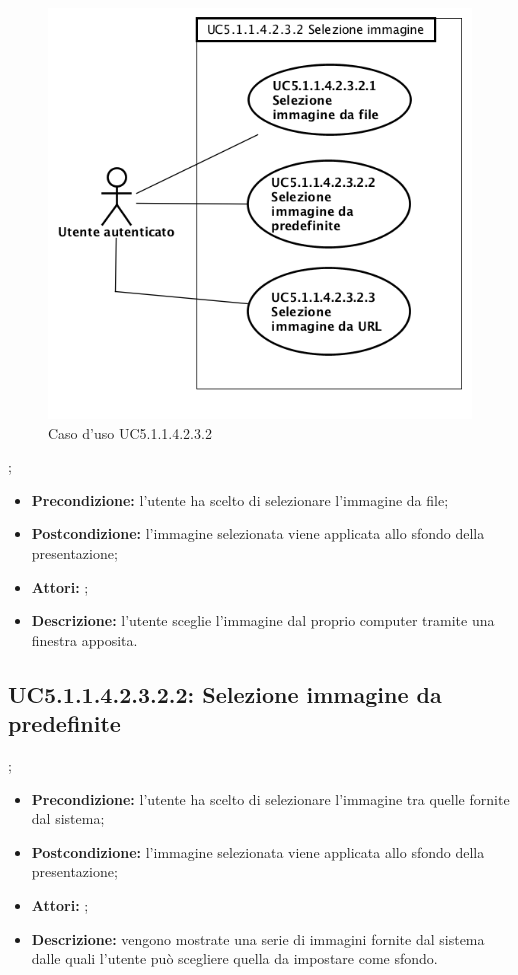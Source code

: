 \begin{figure}[h]
	\begin{center}
	\includegraphics[scale=0.4]{diagram/UC5-1-1-4-2-3-2.png}
	\caption{Caso d'uso UC5.1.1.4.2.3.2}
	\end{center}
\end{figure};
\begin{itemize}
	\item \textbf{Precondizione:} l’utente ha scelto di selezionare l’immagine da file;
	\item \textbf{Postcondizione:} l’immagine selezionata viene applicata allo sfondo della presentazione;
	\item \textbf{Attori:} ;
	\item \textbf{Descrizione:} l’utente sceglie l’immagine dal proprio computer tramite una finestra apposita.
\end{itemize}
\subsection{ UC5.1.1.4.2.3.2.2: Selezione immagine da predefinite}
;
\begin{itemize}
	\item \textbf{Precondizione:} l’utente ha scelto di selezionare l’immagine tra quelle fornite dal sistema;
	\item \textbf{Postcondizione:} l’immagine selezionata viene applicata allo sfondo della presentazione;
	\item \textbf{Attori:} ;
	\item \textbf{Descrizione:} vengono mostrate una serie di immagini fornite dal sistema dalle quali l’utente può scegliere quella da impostare come sfondo.
\end{itemize}
